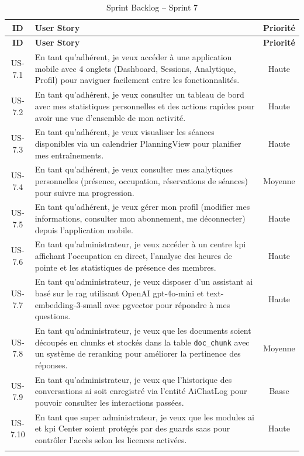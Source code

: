 ﻿\documentclass[../main.tex]{subfiles}
\begin{document}
\begin{longtable}{|c|p{10cm}|c|}
\hline
\textbf{ID} & \textbf{User Story} & \textbf{Priorit\'{e}} \\
\hline
\endfirsthead
\hline
\textbf{ID} & \textbf{User Story} & \textbf{Priorit\'{e}} \\
\hline
\endhead
\hline
\endfoot

US-7.1 & En tant qu'adh\'{e}rent, je veux acc\'{e}der \`{a} une application mobile avec 4 onglets (Dashboard, Sessions, Analytique, Profil) pour naviguer facilement entre les fonctionnalit\'{e}s. & Haute \\
\hline
US-7.2 & En tant qu'adh\'{e}rent, je veux consulter un tableau de bord avec mes statistiques personnelles et des actions rapides pour avoir une vue d'ensemble de mon activit\'{e}. & Haute \\
\hline
US-7.3 & En tant qu'adh\'{e}rent, je veux visualiser les s\'{e}ances disponibles via un calendrier PlanningView pour planifier mes entra\^{i}nements. & Haute \\
\hline
US-7.4 & En tant qu'adh\'{e}rent, je veux consulter mes analytiques personnelles (pr\'{e}sence, occupation, r\'{e}servations de s\'{e}ances) pour suivre ma progression. & Moyenne \\
\hline
US-7.5 & En tant qu'adh\'{e}rent, je veux g\'{e}rer mon profil (modifier mes informations, consulter mon abonnement, me d\'{e}connecter) depuis l'application mobile. & Haute \\
\hline
US-7.6 & En tant qu'administrateur, je veux acc\'{e}der \`{a} un centre \acrshort{kpi} affichant l'occupation en direct, l'analyse des heures de pointe et les statistiques de pr\'{e}sence des membres. & Haute \\
\hline
US-7.7 & En tant qu'administrateur, je veux disposer d'un assistant \acrshort{ai} bas\'{e} sur le \acrshort{rag} utilisant OpenAI \cite{openai} gpt-4o-mini et text-embedding-3-small avec pgvector \cite{pgvector} pour r\'{e}pondre \`{a} mes questions. & Haute \\
\hline
US-7.8 & En tant qu'administrateur, je veux que les documents soient d\'{e}coup\'{e}s en chunks et stock\'{e}s dans la table \texttt{doc\_chunk} avec un syst\`{e}me de reranking pour am\'{e}liorer la pertinence des r\'{e}ponses. & Moyenne \\
\hline
US-7.9 & En tant qu'administrateur, je veux que l'historique des conversations \acrshort{ai} soit enregistr\'{e} via l'entit\'{e} AiChatLog pour pouvoir consulter les interactions pass\'{e}es. & Basse \\
\hline
US-7.10 & En tant que super administrateur, je veux que les modules \acrshort{ai} et \acrshort{kpi} Center soient prot\'{e}g\'{e}s par des guards \acrshort{saas} pour contr\^{o}ler l'acc\`{e}s selon les licences activ\'{e}es. & Haute \\
\hline
\caption{Sprint Backlog -- Sprint 7}
\label{tab:sprint7_backlog}
\end{longtable}
\end{document}
